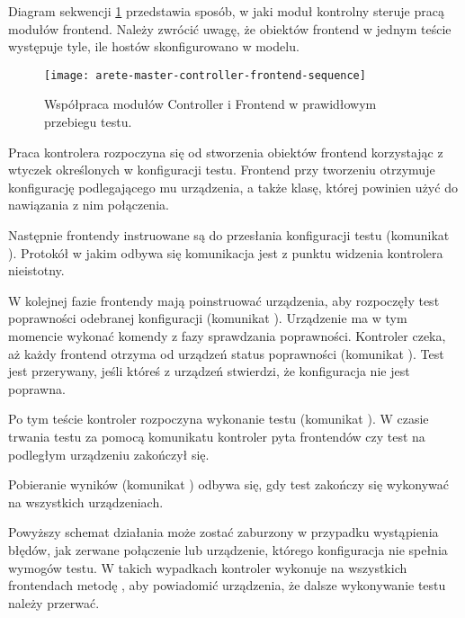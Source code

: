 \documentclass[00-praca-magisterska.tex]{subfiles}
\begin{document}
Diagram sekwencji \ref{fig:arete-master-controller-frontend-sequence}
przedstawia sposób, w jaki moduł kontrolny steruje pracą modułów frontend.
Należy zwrócić uwagę, że obiektów frontend w jednym teście występuje tyle, ile
hostów skonfigurowano w modelu.

\begin{figure}[htb]
\begin{center}
\leavevmode
\texttt{[image: arete-master-controller-frontend-sequence]}
\end{center}
\caption{Współpraca modułów Controller i Frontend w prawidłowym przebiegu testu.}
\label{fig:arete-master-controller-frontend-sequence}
\end{figure}

Praca kontrolera rozpoczyna się od stworzenia obiektów frontend korzystając z
wtyczek określonych w konfiguracji testu. Frontend przy tworzeniu otrzymuje
konfigurację podlegającego mu urządzenia, a także klasę, której powinien użyć
do nawiązania z nim połączenia.

Następnie frontendy instruowane są do przesłania konfiguracji testu (komunikat
). Protokół w jakim odbywa się komunikacja jest z
punktu widzenia kontrolera nieistotny.

W kolejnej fazie frontendy mają poinstruować urządzenia, aby rozpoczęły test
poprawności odebranej konfiguracji (komunikat ).
Urządzenie ma w tym momencie wykonać komendy z fazy sprawdzania poprawności.
Kontroler czeka, aż każdy frontend otrzyma od urządzeń status poprawności
(komunikat ). Test jest przerywany, jeśli któreś z
urządzeń stwierdzi, że konfiguracja nie jest poprawna.

Po tym teście kontroler rozpoczyna wykonanie testu (komunikat
). W czasie trwania testu za pomocą komunikatu
 kontroler pyta frontendów czy test na podległym
urządzeniu zakończył się.

Pobieranie wyników (komunikat ) odbywa się, gdy test
zakończy się wykonywać na wszystkich urządzeniach.

Powyższy schemat działania może zostać zaburzony w przypadku wystąpienia
błędów, jak zerwane połączenie lub urządzenie, którego konfiguracja nie spełnia
wymogów testu. W takich wypadkach kontroler wykonuje na wszystkich frontendach
metodę , aby powiadomić urządzenia, że dalsze wykonywanie
testu należy przerwać.
\end{document}
